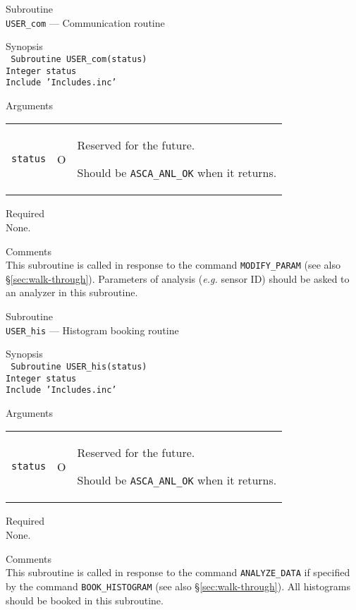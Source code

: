 \newpage
\begin{description}
\item{Subroutine}\\
   {\tt USER\_com} --- Communication routine
\item{Synopsis}\\
   {\tt
      Subroutine USER\_com(status) \\
      Integer status \\
      Include 'Includes.inc'
   }
\item{Arguments} \\
 \begin{tabular}{l@{\ (}c@{)\ }p{}}
   {\tt status} & O & Reserved for the future.\par
                      Should be {\tt ASCA\_ANL\_OK} when it returns.
 \end{tabular}
\item{Required} \\
   None.
\item{Comments} \\
   This subroutine is called in response to the command
   {\tt MODIFY\_PARAM} (see also \S \ref{sec:walk-through}).
   Parameters of analysis ({\em e.g.} sensor ID)
   should be asked to an analyzer in this subroutine.
\end{description}

\vspace{1cm}

\newpage
\begin{description}
\item{Subroutine}\\
   {\tt USER\_his} --- Histogram booking routine
\item{Synopsis}\\
   {\tt
      Subroutine USER\_his(status) \\
      Integer status \\
      Include 'Includes.inc'
   }
\item{Arguments} \\
 \begin{tabular}{l@{\ (}c@{)\ }p{}}
   {\tt status} & O & Reserved for the future.\par
                      Should be {\tt ASCA\_ANL\_OK} when it returns.
 \end{tabular}
\item{Required} \\
   None.
\item{Comments} \\
   This subroutine is called in response to the command
   {\tt ANALYZE\_DATA} if specified by the command {\tt BOOK\_HISTOGRAM}
   (see also \S \ref{sec:walk-through}).
   All histograms should be booked in this subroutine.
\end{description}

